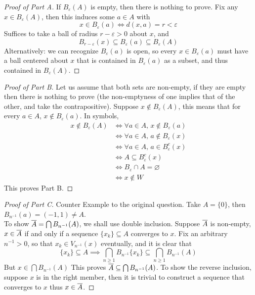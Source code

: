 \documentclass[../main.tex]{subfiles}
\begin{document}
\begin{proof}[Proof of Part A]
    If $B_\varepsilon(A)$ is empty, then there is nothing to prove. Fix any $x\in B_\varepsilon(A)$, then this induces some $a\in A$ with\[x\in B_\varepsilon(a)\iff d(x,a)=r<\varepsilon\] Suffices to take a ball of radius $r-\varepsilon>0$ about $x$, and 
    \[
    B_{r-\varepsilon}(x)\subseteq B_{\varepsilon}(a)\subseteq B_\varepsilon(A)
    \]
    Alternatively: we can recognize $B_\varepsilon(a)$ is open, so every $x\in B_\varepsilon(a)$ must have a ball centered about $x$ that is contained in $B_\varepsilon(a)$ as a subset, and thus contained in $B_\varepsilon(A)$.
\end{proof}
\begin{proof}[Proof of Part B]
    Let us assume that both sets are non-empty, if they are empty then there is nothing to prove (the non-emptyness of one implies that of the other, and take the contrapositive). Suppose $x\notin B_\varepsilon(A)$, this means that for every $a\in A$, $x\notin B_\varepsilon(a)$. In symbols,
    \begin{align*}
        x\notin B_\varepsilon(A)&\iff\forall a\in A,\,x\notin B_\varepsilon(a)\\
        &\iff \forall a\in A,\,a\notin B_\varepsilon(x)\\
        &\iff \forall a\in A,\,a\in B_\varepsilon^c(x)\\
        &\iff A\subseteq B_\varepsilon^c(x)\\
        &\iff B_\varepsilon\cap A=\varnothing\\
        &\iff x\notin W
    \end{align*}
    This proves Part B. 
\end{proof}
\begin{proof}[Proof of Part C]
    Counter Example to the original question. Take $A=\{0\}$, then $B_{n^{-1}}(a)=(-1,1)\neq A$.\\
    
    To show $\overline{A}=\bigcap B_{n^{-1}}(A)$, we shall use double inclusion.
    Suppose $\overline{A}$ is non-empty, $x\in\overline{A}$ if and only if a sequence $\{x_k\}\subseteq A$ converges to $x$. Fix an arbitrary $n^{-1}>0$, so that $x_k\in V_{n^{-1}}(x)$ eventually, and it is clear that \[\{x_k\}\subseteq A\implies \bigcap_{n\geq 1}B_{n^{-1}}\{x_k\}\subseteq \bigcap_{n\geq 1}B_{n^{-1}}(A)\]
    But $x\in \bigcap B_{n^{-1}}(A)$
    This proves $\overline{A}\subseteq\bigcap B_{n^{-1}}(A)$. To show the reverse inclusion, suppose $x$ is in the right member, then it is trivial to construct a sequence that converges to $x$ thus $x\in\overline{A}$.
\end{proof}
\end{document}
